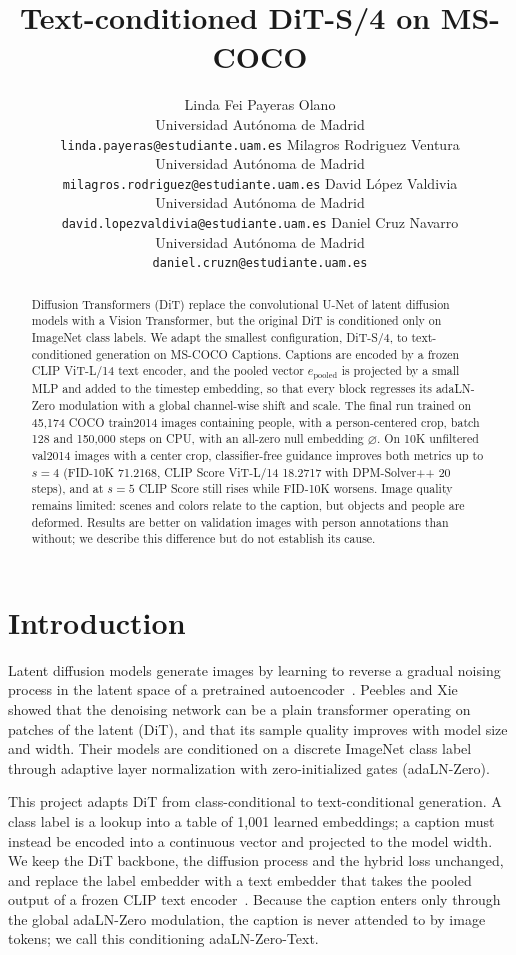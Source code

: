 \documentclass{article}
\title{Text-conditioned DiT-S/4 on MS-COCO}
\author{
Linda Fei Payeras Olano \\
Universidad Aut\'onoma de Madrid \\
{\small\texttt{linda.payeras@estudiante.uam.es}} \And
Milagros Rodriguez Ventura \\
Universidad Aut\'onoma de Madrid \\
{\small\texttt{milagros.rodriguez@estudiante.uam.es}} \AND
David L\'opez Valdivia \\
Universidad Aut\'onoma de Madrid \\
{\small\texttt{david.lopezvaldivia@estudiante.uam.es}} \And
Daniel Cruz Navarro \\
Universidad Aut\'onoma de Madrid \\
{\small\texttt{daniel.cruzn@estudiante.uam.es}}
}
\newcommand{\nullemb}{\varnothing}
\newcommand{\epooled}{e_{\mathrm{pooled}}}
\begin{document}
\maketitle

\begin{abstract}
Diffusion Transformers (DiT) replace the convolutional U-Net of latent diffusion models with a Vision Transformer, but the original DiT is conditioned only on ImageNet class labels.
We adapt the smallest configuration, DiT-S/4, to text-conditioned generation on MS-COCO Captions.
Captions are encoded by a frozen CLIP ViT-L/14 text encoder, and the pooled vector $\epooled$ is projected by a small MLP and added to the timestep embedding, so that every block regresses its adaLN-Zero modulation with a global channel-wise shift and scale.
The final run trained on 45,174 COCO train2014 images containing people, with a person-centered crop, batch 128 and 150,000 steps on CPU, with an all-zero null embedding $\nullemb$.
On 10K unfiltered val2014 images with a center crop, classifier-free guidance improves both metrics up to $s=4$ (FID-10K 71.2168, CLIP Score ViT-L/14 18.2717 with DPM-Solver++ 20 steps), and at $s=5$ CLIP Score still rises while FID-10K worsens.
Image quality remains limited: scenes and colors relate to the caption, but objects and people are deformed.
Results are better on validation images with person annotations than without; we describe this difference but do not establish its cause.
\end{abstract}

\section{Introduction}

Latent diffusion models generate images by learning to reverse a gradual noising process in the latent space of a pretrained autoencoder~\cite{ho2020ddpm,rombach2022ldm}.
Peebles and Xie~\cite{peebles2023dit} showed that the denoising network can be a plain transformer operating on patches of the latent (DiT), and that its sample quality improves with model size and width.
Their models are conditioned on a discrete ImageNet class label through adaptive layer normalization with zero-initialized gates (adaLN-Zero).

This project adapts DiT from class-conditional to text-conditional generation.
A class label is a lookup into a table of 1,001 learned embeddings; a caption must instead be encoded into a continuous vector and projected to the model width.
We keep the DiT backbone, the diffusion process and the hybrid loss unchanged, and replace the label embedder with a text embedder that takes the pooled output of a frozen CLIP text encoder~\cite{radford2021clip}.
Because the caption enters only through the global adaLN-Zero modulation, the caption is never attended to by image tokens; we call this conditioning adaLN-Zero-Text.
\end{document}
